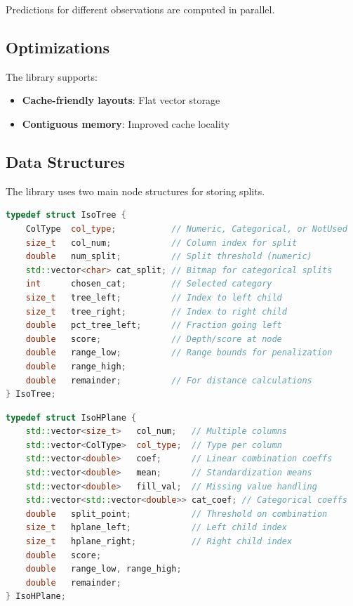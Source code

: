 Predictions for different observations are computed in parallel.

\subsection{Optimizations}

The library supports:
\begin{itemize}
    \item \textbf{Cache-friendly layouts}: Flat vector storage
    \item \textbf{Contiguous memory}: Improved cache locality
\end{itemize}

\subsection{Data Structures}

The library uses two main node structures for storing splits.


\begin{lstlisting}[language=C++,basicstyle=\ttfamily\small,frame=single,caption={Standard node structure for IF},label={lst:isotree-struct}]
typedef struct IsoTree {
    ColType  col_type;           // Numeric, Categorical, or NotUsed
    size_t   col_num;            // Column index for split
    double   num_split;          // Split threshold (numeric)
    std::vector<char> cat_split; // Bitmap for categorical splits
    int      chosen_cat;         // Selected category
    size_t   tree_left;          // Index to left child
    size_t   tree_right;         // Index to right child
    double   pct_tree_left;      // Fraction going left
    double   score;              // Depth/score at node
    double   range_low;          // Range bounds for penalization
    double   range_high;
    double   remainder;          // For distance calculations
} IsoTree;
\end{lstlisting}

\begin{lstlisting}[language=C++,basicstyle=\ttfamily\small,frame=single,caption={Hyperplane node for EIF/FCF},label={lst:isohplane-struct}]
typedef struct IsoHPlane {
    std::vector<size_t>   col_num;   // Multiple columns
    std::vector<ColType>  col_type;  // Type per column
    std::vector<double>   coef;      // Linear combination coeffs
    std::vector<double>   mean;      // Standardization means
    std::vector<double>   fill_val;  // Missing value handling
    std::vector<std::vector<double>> cat_coef; // Categorical coeffs
    double   split_point;            // Threshold on combination
    size_t   hplane_left;            // Left child index
    size_t   hplane_right;           // Right child index
    double   score;
    double   range_low, range_high;
    double   remainder;
} IsoHPlane;
\end{lstlisting}



